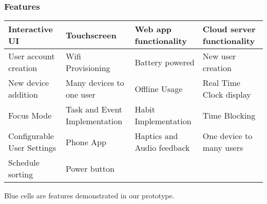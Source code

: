 \documentclass{beamer}
\begin{document}
\begin{frame}
  \frametitle{Features}
\centering
\small
\begin{tabular}{|p{}|p{}|p{}|p{}|}
\hline
\cellcolor[HTML]{CFE2F3}Interactive UI        & Touchscreen                                           & \cellcolor[HTML]{CFE2F3}Web app functionality & \cellcolor[HTML]{CFE2F3}Cloud server functionality \\ \hline
\cellcolor[HTML]{CFE2F3}User account creation & \cellcolor[HTML]{CFE2F3}Wifi Provisioning             & Battery powered                               & \cellcolor[HTML]{CFE2F3}New user creation          \\ \hline
\cellcolor[HTML]{CFE2F3}New device addition                           & \cellcolor[HTML]{CFE2F3}Many devices to one user      & \cellcolor[HTML]{CFE2F3}Offline Usage         & \cellcolor[HTML]{CFE2F3}Real Time Clock display    \\ \hline
\cellcolor[HTML]{CFE2F3}Focus Mode            & \cellcolor[HTML]{CFE2F3}Task and Event Implementation & \cellcolor[HTML]{CFE2F3}Habit Implementation  & Time Blocking                                      \\ \hline
Configurable User Settings                    & Phone App                                     & Haptics and Audio feedback                        & One device to many users                      \\ \hline
Schedule sorting                                      & Power button & &                                                    \\ \hline
\end{tabular}
Blue cells are features demonstrated in our prototype.
\end{frame}
  
\end{document}
